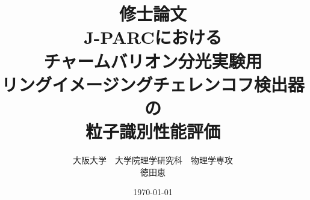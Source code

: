 \title{\Huge 修士論文\\[1cm]
  \huge J-PARCにおける\\チャームバリオン分光実験用\\リングイメージングチェレンコフ検出器の\\粒子識別性能評価\\[1cm]}
\author{\Large 大阪大学　大学院理学研究科　物理学専攻\\
  \Large 徳田恵\\[0.5cm]}
\date{\Large \today}